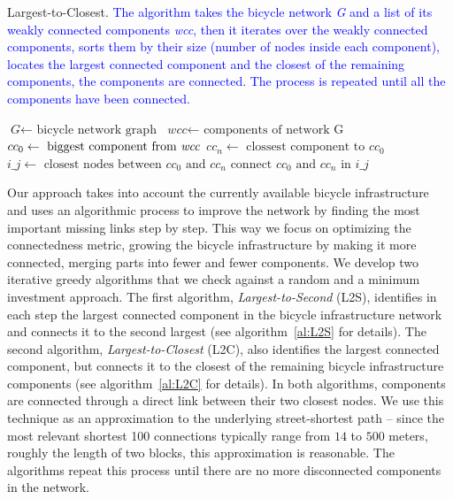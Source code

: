 \begin{algorithm}[h!]
  \caption{Largest-to-Closest. \textcolor{blue}{The algorithm takes the bicycle network \textit{G} and a list of its weakly connected components \textit{wcc}, then it iterates over the weakly connected components, sorts them by their size (number of nodes inside each component), locates the largest connected component and the closest of the remaining components, the components are connected. The process is repeated until all the components have been connected.}}\label{al:L2C}
  \begin{algorithmic}[1]
    \State $\textit{G} \gets \text{ bicycle network graph}$
    \State $\textit{wcc} \gets \text{ components of network G}$
    \State  {}
    \State $cc_0 \gets \text{ biggest component from \textit{wcc}}$
    \State $cc_n \gets \text{ clossest component to } cc_0$
    \State $\textit{i\_j} \gets \text{ closest nodes between } cc_0 \text{ and } cc_n$
    \State $\text{connect } cc_0 \text{ and } cc_n \text{ in } i\_j$
    \EndFor
    \EndProcedure
  \end{algorithmic}
\end{algorithm}

Our approach takes into account the currently available bicycle infrastructure and uses an algorithmic process to improve the network by finding the most important missing links step by step. This way we focus on optimizing the connectedness metric, growing the bicycle infrastructure by making it more connected, merging parts into fewer and fewer components. We develop two iterative greedy algorithms that we check against a random and a minimum investment approach. The first algorithm, \emph{Largest-to-Second} (L2S), identifies in each step the largest connected component in the bicycle infrastructure network and connects it to the second largest (see algorithm~\ref{al:L2S} for details). The second algorithm, \emph{Largest-to-Closest} (L2C), also identifies the largest connected component, but connects it to the closest of the remaining bicycle infrastructure components (see algorithm~\ref{al:L2C} for details). In both algorithms, components are connected through a direct link between their two closest nodes. We use this technique as an approximation to the underlying street-shortest path -- since the most relevant shortest 100 connections typically range from $14$ to $500$ meters, roughly the length of two blocks, this approximation is reasonable. The algorithms repeat this process until there are no more disconnected components in the network.

